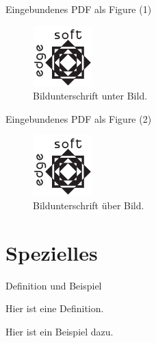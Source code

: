 
	\begin{frame}{Eingebundenes PDF als Figure (1)}
		\begin{figure}
			\includegraphics{testlogo}
			\caption{Bildunterschrift unter Bild.}
		\end{figure}
	\end{frame}


	\begin{frame}{Eingebundenes PDF als Figure (2)}
		\begin{figure}
			\caption{Bildunterschrift über Bild.}
			\includegraphics{testlogo}
		\end{figure}
	\end{frame}


	\section{Spezielles}

	\begin{frame}{Definition und Beispiel}
		\begin{definition}
			Hier ist eine Definition.
		\end{definition}
		\begin{example}
			Hier ist ein Beispiel dazu.
		\end{example}
	\end{frame}


